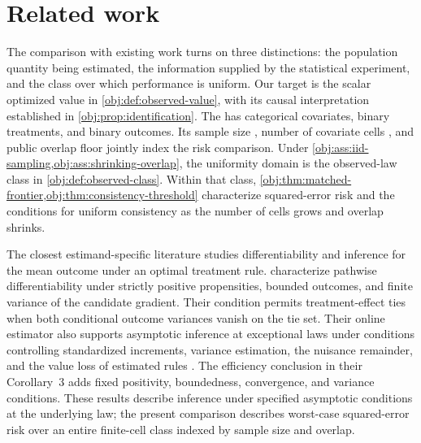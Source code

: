 \section{Related work}

The comparison with existing work turns on three distinctions: the population quantity being estimated, the information supplied by the statistical experiment, and the class over which performance is uniform. Our target is the scalar optimized value in \cref{obj:def:observed-value}, with its causal interpretation established in \cref{obj:prop:identification}. The  has categorical covariates, binary treatments, and binary outcomes. Its sample size , number of covariate cells , and public overlap floor  jointly index the risk comparison. Under \cref{obj:ass:iid-sampling,obj:ass:shrinking-overlap}, the uniformity domain is the observed-law class in \cref{obj:def:observed-class}. Within that class, \cref{obj:thm:matched-frontier,obj:thm:consistency-threshold} characterize squared-error risk and the conditions for uniform consistency as the number of cells grows and overlap shrinks.

The closest estimand-specific literature studies differentiability and inference for the mean outcome under an optimal treatment rule. \citet[Theorem~1 and equation~(3)]{LuedtkeVanderLaan2016OptimalValue} characterize pathwise differentiability under strictly positive propensities, bounded outcomes, and finite variance of the candidate gradient. Their condition permits treatment-effect ties when both conditional outcome variances vanish on the tie set. Their online estimator also supports asymptotic inference at exceptional laws under conditions controlling standardized increments, variance estimation, the nuisance remainder, and the value loss of estimated rules \citep[Theorem~2, conditions~(C1)--(C5)]{LuedtkeVanderLaan2016OptimalValue}. The efficiency conclusion in their Corollary~3 adds fixed positivity, boundedness, convergence, and variance conditions. These results describe inference under specified asymptotic conditions at the underlying law; the present comparison describes worst-case squared-error risk over an entire finite-cell class indexed by sample size and overlap.

